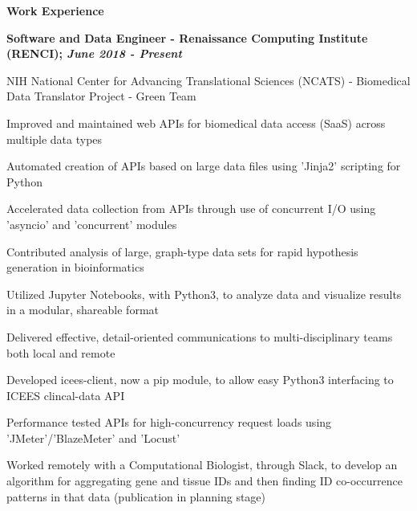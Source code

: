 \documentclass[letterpaper,final]{memoir}
\newcommand{\Sep}{\vspace{1.0em}}
\newcommand{\SmallSep}{\vspace{0.4em}}
\newcommand{\CVSection}[1]
	{\LARGE\textbf{#1}\par
	\SmallSep\normalsize}
\newcommand{\CVItem}[1]
	{\textbf{\color{Blue} #1}}
\begin{document}

\notoserif \CVSection{Work Experience}
\normalfont

\Sep

\CVItem{Software and Data Engineer - Renaissance Computing Institute (RENCI); \textit{June 2018 - Present}}
\begin{compactitem}[\color{Blue}$\circ$]
    
    \SmallSep
    \item NIH National Center for Advancing Translational Sciences (NCATS) - Biomedical Data Translator Project - Green Team
    \SmallSep
    \item Improved and maintained web APIs for biomedical data access (SaaS) across multiple data types
    \SmallSep
    \item Automated creation of APIs based on large data files using 'Jinja2' scripting for Python
    \SmallSep
    \item Accelerated data collection from APIs through use of concurrent I/O using 'asyncio' and 'concurrent' modules
    \SmallSep
    \item Contributed analysis of large, graph-type data sets for rapid hypothesis generation in bioinformatics
    \SmallSep
    \item Utilized Jupyter Notebooks, with Python3, to analyze data and visualize results in a modular, shareable format
    \SmallSep
    \item Delivered effective, detail-oriented communications to multi-disciplinary teams both local and remote
    \SmallSep
    \item Developed icees-client, now a pip module, to allow easy Python3 interfacing to ICEES clincal-data API
    \SmallSep
    \item Performance tested APIs for high-concurrency request loads using 'JMeter'/'BlazeMeter' and 'Locust'
    \SmallSep
    \item Worked remotely with a Computational Biologist, through Slack, to develop an algorithm for 
    aggregating gene and tissue IDs and then finding ID co-occurrence patterns in that data (publication in planning stage)

\end{compactitem}

\Sep
\end{document}
